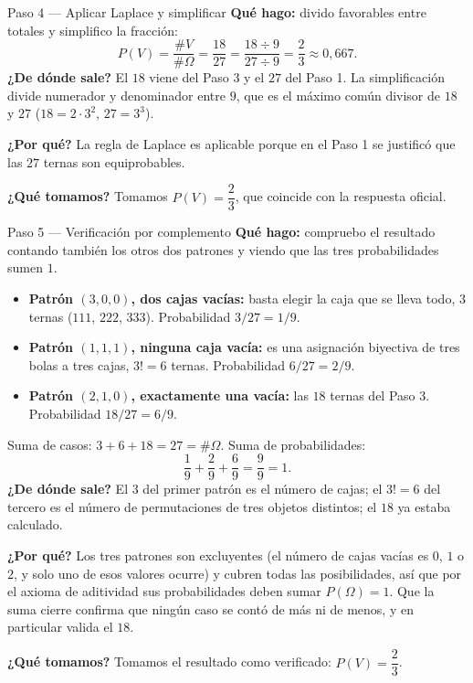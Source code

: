 \documentclass[11pt]{article}
\begin{document}
\begin{sol}
\begin{paso}{Paso 4 --- Aplicar Laplace y simplificar}
\textbf{Qué hago:} divido favorables entre totales y simplifico la fracción:
\[
P(V)=\frac{\#V}{\#\Omega}=\frac{18}{27}=\frac{18\div 9}{27\div 9}=\frac{2}{3}\approx 0{,}667 .
\]
\textbf{¿De dónde sale?} El $18$ viene del Paso 3 y el $27$ del Paso 1. La simplificación
divide numerador y denominador entre $9$, que es el máximo común divisor de $18$ y $27$
($18=2\cdot 3^2$, $27=3^3$).

\textbf{¿Por qué?} La regla de Laplace es aplicable porque en el Paso 1 se justificó que las
$27$ ternas son equiprobables.

\textbf{¿Qué tomamos?} Tomamos $P(V)=\dfrac{2}{3}$, que coincide con la respuesta oficial.
\end{paso}

\begin{paso}{Paso 5 --- Verificación por complemento}
\textbf{Qué hago:} compruebo el resultado contando también los otros dos patrones y viendo que
las tres probabilidades sumen $1$.
\begin{itemize}[leftmargin=*]
  \item \textbf{Patrón $(3,0,0)$, dos cajas vacías:} basta elegir la caja que se lleva todo,
        $3$ ternas ($111$, $222$, $333$). Probabilidad $3/27=1/9$.
  \item \textbf{Patrón $(1,1,1)$, ninguna caja vacía:} es una asignación biyectiva de tres
        bolas a tres cajas, $3!=6$ ternas. Probabilidad $6/27=2/9$.
  \item \textbf{Patrón $(2,1,0)$, exactamente una vacía:} las $18$ ternas del Paso 3.
        Probabilidad $18/27=6/9$.
\end{itemize}
Suma de casos: $3+6+18=27=\#\Omega$. Suma de probabilidades:
\[
\frac{1}{9}+\frac{2}{9}+\frac{6}{9}=\frac{9}{9}=1 .
\]
\textbf{¿De dónde sale?} El $3$ del primer patrón es el número de cajas; el $3!=6$ del tercero
es el número de permutaciones de tres objetos distintos; el $18$ ya estaba calculado.

\textbf{¿Por qué?} Los tres patrones son excluyentes (el número de cajas vacías es $0$, $1$ o
$2$, y solo uno de esos valores ocurre) y cubren todas las posibilidades, así que por el
axioma de aditividad sus probabilidades deben sumar $P(\Omega)=1$. Que la suma cierre confirma
que ningún caso se contó de más ni de menos, y en particular valida el $18$.

\textbf{¿Qué tomamos?} Tomamos el resultado como verificado: $P(V)=\dfrac{2}{3}$.
\end{paso}
\end{sol}
\end{document}
